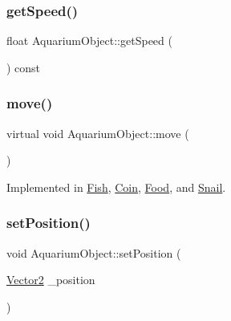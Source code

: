 \subsubsection{\texorpdfstring{get\+Speed()}{getSpeed()}}
{\footnotesize\ttfamily float Aquarium\+Object\+::get\+Speed (\begin{DoxyParamCaption}{ }\end{DoxyParamCaption}) const}

\mbox{\label{class_aquarium_object_a42c4de640f89ac8aebc26b7618578575}} 
\subsubsection{\texorpdfstring{move()}{move()}}
{\footnotesize\ttfamily virtual void Aquarium\+Object\+::move (\begin{DoxyParamCaption}{ }\end{DoxyParamCaption})\hspace{0.3cm}{\ttfamily [pure virtual]}}



Implemented in \mbox{\hyperlink{class_fish_a1a18368573aab3b14a83aaf2424630ec}{Fish}}, \mbox{\hyperlink{class_coin_ab62bca5834489b9b483deaa3ca3470e9}{Coin}}, \mbox{\hyperlink{class_food_afb37f87b673df87697665ae82b6da0da}{Food}}, and \mbox{\hyperlink{class_snail_af5892ec122d9199480c813b74488256b}{Snail}}.

\mbox{\label{class_aquarium_object_a2ec88f59595aec6ad788b90e9896b9b9}} 
\subsubsection{\texorpdfstring{set\+Position()}{setPosition()}}
{\footnotesize\ttfamily void Aquarium\+Object\+::set\+Position (\begin{DoxyParamCaption}\item[{\mbox{\hyperlink{struct_vector2}{Vector2}}}]{\+\_\+position }\end{DoxyParamCaption})}

\mbox{\label{class_aquarium_object_a3a8269dfe29631656916cce254e77059}} 
